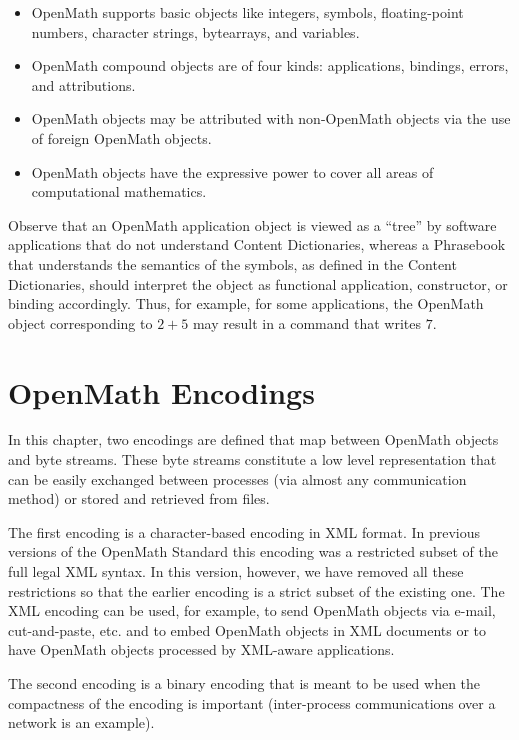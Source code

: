 \documentclass{report}
\def\textquote#1{``#1''}
\def\OM{OpenMath\xspace}
\def\XML{XML\xspace}
\begin{document}
\begin{itemize}
\item \OM supports basic objects like integers, symbols, floating-point numbers, character
  strings, bytearrays, and variables.
\item \OM compound objects are of four kinds: applications, bindings, errors, and
  attributions.
\item \OM objects may be attributed with non-\OM objects via the use of foreign \OM
  objects.
\item \OM objects have the expressive power to cover all areas of computational
  mathematics.
\end{itemize}

Observe that an \OM application object is viewed as a \textquote{tree} by software
applications that do not understand Content Dictionaries, whereas a Phrasebook that
understands the semantics of the symbols, as defined in the Content Dictionaries, should
interpret the object as functional application, constructor, or binding accordingly. Thus,
for example, for some applications, the \OM object corresponding to $2+5$ may result in a
command that writes $7$.



\chapter{\OM Encodings}\label{cha_enco}


In this chapter, two encodings are defined that map between \OM
objects and byte streams.  These byte streams constitute a low level
representation that can be easily exchanged between processes (via
almost any communication method) or stored and retrieved from
files.




The first encoding is a character-based
encoding in \XML format.  In previous versions of the \OM Standard
this encoding was a restricted subset of the full legal \XML syntax.
In this version, however, we have removed all these restrictions so that
the earlier encoding is a strict subset of the existing one.  The
\XML encoding can be used, for example, to send \OM objects via
e-mail, cut-and-paste, etc. and to embed \OM objects in \XML
documents or to have \OM objects processed by \XML-aware
applications.


The second encoding is a binary encoding that is meant to be
used when the compactness of the encoding is important (inter-process
communications over a network is an example).
\end{document}
